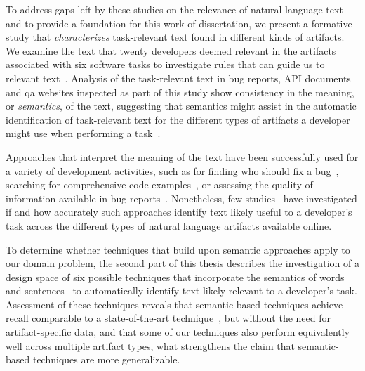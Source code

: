 To address gaps left by these studies on the relevance of natural language text
and to provide a foundation for this work of dissertation,
we present a formative study that \textit{characterizes} task-relevant text 
found in different kinds of artifacts. 
We examine the text that twenty developers deemed relevant in the  artifacts  associated with six software tasks to investigate 
rules that can guide us to relevant text~\cite{Kintsch1978a}.
Analysis of the task-relevant text  in bug
reports, API documents and \acf{qa} websites 
inspected as part of this study 
 show consistency in the meaning, or \textit{semantics}, of the
 text, suggesting that 
semantics might assist in the automatic identification of
task-relevant text for the different types of artifacts a developer 
might use when performing a task~\cite{Meyer2019, Li2013}.







Approaches that interpret the meaning of the text have been successfully used for a variety of development activities,
such as for finding who should fix a bug~\cite{yang2016}, searching for comprehensive code examples~\cite{silva2019}, or assessing the quality of information available in bug reports~\cite{chaparro2019}.
Nonetheless, few studies~\cite{Ponzanelli2017, Liu2018Unakite} have investigated if and how accurately such approaches identify
text likely 
useful to a developer's task across the different types of natural language artifacts available online.


To determine whether
techniques that build upon semantic approaches 
apply to our domain problem,
the second part of this thesis describes 
the investigation of a design space
of six possible techniques that incorporate the semantics of words~\cite{Mikolov2013, Devlin2018Bert}
and sentences~\cite{fillmore1976frame, marques2021}
to automatically identify text likely relevant to a developer's task.
Assessment of these techniques reveals that semantic-based techniques
achieve recall comparable to a state-of-the-art technique~\cite{Xu2017}, but without the need for artifact-specific data,
and that some of our techniques also perform equivalently well across
multiple artifact types, what strengthens the claim that semantic-based  
techniques are more generalizable.






